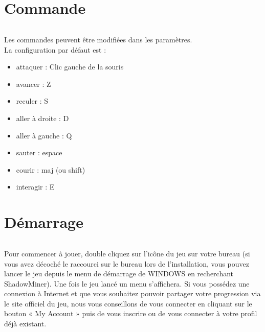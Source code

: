 \documentclass[titlepage, 11px, a4paper]{report}
\begin{document}

\newpage


\part{Commande} 
\paragraph*{} \hspace{0pt}
Les commandes peuvent être modifiées dans les paramètres. \\ La configuration par défaut est : \\
{\begin{itemize}
	\item attaquer : Clic gauche de la souris
	\item avancer : Z
	\item reculer : S
	\item aller à droite : D
	\item aller à gauche : Q
	\item sauter : espace
	\item courir : maj (ou shift)
	\item interagir :  E \\
\end{itemize}}


\newpage


\part{Démarrage}
\paragraph*{} \hspace{0pt}
Pour commencer à jouer, double cliquez sur l’icône du jeu sur votre bureau (si vous avez décoché le raccourci sur 
le bureau lors de l'installation, vous pouvez lancer le jeu depuis le menu de démarrage de WINDOWS en recherchant ShadowMiner). 
Une fois le jeu lancé un menu s'affichera. Si vous possédez une connexion à Internet et que vous souhaitez pouvoir 
partager votre progression via le site officiel du jeu, nous vous conseillons de vous connecter en cliquant sur le 
bouton « My Account » puis de vous inscrire ou de vous connecter à votre profil déjà existant. \\
\end{document}
